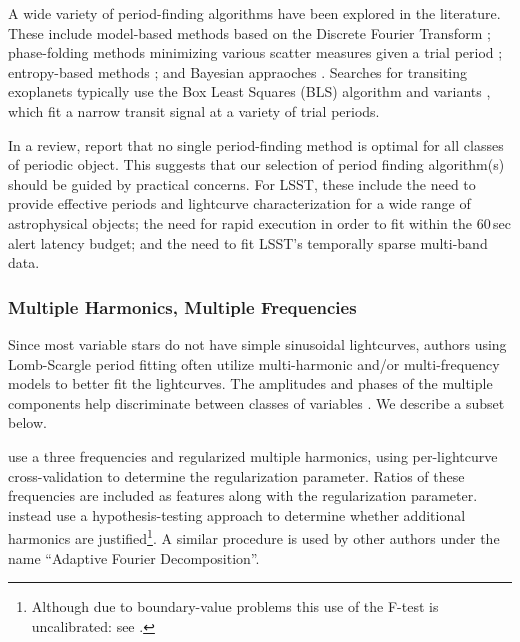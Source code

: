 \documentclass[DM,authoryear,toc]{lsstdoc}
\begin{document}
A wide variety of period-finding algorithms have been explored in the literature. 
These include model-based methods based on the Discrete Fourier Transform \citep[especially the Lomb-Scargle Periodogram and variants;][]{Lomb:76:Least-Squares-F, Scargle:82:Studies-in-astr,Zechmeister:09:GeneralisedLS,VanderPlas:18:UnderstandingLS}; 
phase-folding methods minimizing various scatter measures given a trial period \citep[e.g.,][]{Stellingwerf:78:PDM,Dworetsky:83:StringLength,Schwarzenberg-Czerny:89:AOV,Clarke:02:StringLength,Zucker:16:SerialIndependence}; 
entropy-based methods \citep[e.g.,]{Cincotta:95:Astronomical-Ti,Cincotta:99:Astronomical-ti,Huijse:12:CorrentropyPeriodogram, Graham:13:ConditionalEntropy}; 
and Bayesian appraoches \citep[e.g.,][]{Gregory:92:A-New-Method-fo,Wang:12:NonpBayesPeriods}.
Searches for transiting exoplanets typically use the Box Least Squares (BLS) algorithm \citep{Kovacs:02:BoxLS} and variants \citep[e.g.,][]{Heller:19:TransitLS}, which fit a narrow transit signal at a variety of trial periods.

In a review, \citet{Graham:13:PeriodFindingComparison} report that no single period-finding method is optimal for all classes of periodic object.
This suggests that our selection of period finding algorithm(s) should be guided by practical concerns.
For LSST, these include the need to provide effective periods and lightcurve characterization for a wide range of astrophysical objects; the need for rapid execution in order to fit within the 60\,sec alert latency budget; and the need to fit LSST's temporally sparse multi-band data.

\subsubsection{Multiple Harmonics, Multiple Frequencies}

Since most variable stars do not have simple sinusoidal lightcurves, authors using Lomb-Scargle period fitting often utilize multi-harmonic and/or multi-frequency models to better fit the lightcurves.
The amplitudes and phases of the multiple components help discriminate between classes of variables \citep[e.g.,][]{Selam:04:WUMa}.
We describe a subset below.

\citet{Richards:12:ASASCatalog} use a three frequencies and regularized multiple harmonics, using per-lightcurve cross-validation to determine the regularization parameter.
Ratios of these frequencies are included as features along with the regularization parameter.
\citet{Dubath:11:VariableClassification} instead use a hypothesis-testing approach to determine whether additional harmonics are justified\footnote{Although due to boundary-value problems this use of the F-test is uncalibrated: see \citet{Protassov:02:LRTest}.}.
A similar procedure is used by other authors \citep[e.g.,][]{Drake:13:CSSRRLyr,Torrealba:15:SouthCSSRRLyr} under the name ``Adaptive Fourier Decomposition''.
\end{document}
